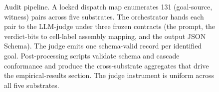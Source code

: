 \begin{figure}[t]
\caption{Audit pipeline. A locked dispatch map enumerates 131 (goal-source,
witness) pairs across five substrates. The orchestrator hands each pair to
the LLM-judge under three frozen contracts (the prompt, the verdict-bits to
cell-label assembly mapping, and the output JSON Schema). The judge emits one
schema-valid record per identified goal. Post-processing scripts validate
schema and cascade conformance and produce the cross-substrate aggregates
that drive the empirical-results section. The judge instrument is uniform
across all five substrates.}
\label{fig:pipeline}
\end{figure}
